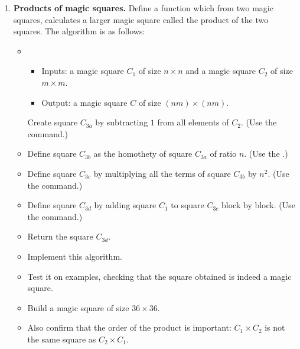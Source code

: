 \documentclass[11pt,class=report,crop=false]{standalone}
\begin{document}
\begin{activite}
\begin{enumerate}
 \item \textbf{Products of magic squares.} Define a  function which from two magic squares, calculates a larger magic square called the product of the two squares. The algorithm is as follows:

 \begin{algorithme}
  \sauteligne 
 \begin{itemize}
   \item
   \begin{itemize}
     \item Inputs: a magic square $C_1$ of size $n\times n$ and a magic square $C_2$ of size $m\times m$.
     \item Output: a magic square $C$ of size $(nm)\times(nm)$.
   \end{itemize}

  Create square $C_{3a}$ by subtracting $1$ from all elements of $C_2$. (Use the  command.)
  
  \item Define square $C_{3b}$ as the homothety of square $C_{3a}$ of ratio $n$. (Use the .)
  
  \item Define square $C_{3c}$ by multiplying all the terms of square $C_{3b}$ by $n^2$. (Use the  command.)
  
  \item Define square $C_{3d}$ by adding square $C_1$ to square $C_{3c}$  block by block. (Use the  command.)
  
  \item Return the square $C_{3d}$.
   
 \end{itemize}  
 \end{algorithme}
 
 \begin{itemize}
   \item Implement this algorithm. 
   \item Test it on examples, checking that the square obtained is indeed a magic square.
   \item Build a magic square of size $36 \times 36$.
   \item Also confirm that the order of the product is important: $C_1 \times C_2$ is not the same square as $C_2 \times C_1$. 
  \end{itemize}  

\end{enumerate}

\end{activite}
\end{document}

